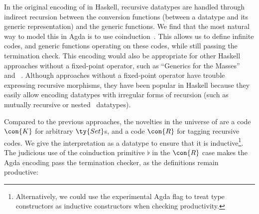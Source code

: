 \documentclass[submission,copyright,creativecommons,sharealike,noncommercial]{eptcs}
\newcommand{\Varid}[1]{\mathit{#1}}
\renewcommand\Varid[1]{\mathord{\textsf{#1}}}
\begin{document}
In the original encoding of \ig in Haskell, recursive datatypes are handled
through indirect recursion between the conversion functions (between a
datatype and its generic representation) and the generic functions. We find
that the most natural way to model this in Agda is to use
coinduction~\cite{subtyping}. This allows us to define infinite codes, and
generic functions operating on these codes, while still passing the
termination check.
This encoding would also be appropriate for other Haskell approaches without a
fixed-point operator, such as ``Generics for the Masses''~\cite{GM} and
\ligd~\cite{LIGD}. Although approaches without a fixed-point operator have
trouble expressing recursive morphisms, they have been popular in Haskell
because they easily allow encoding datatypes with irregular forms of recursion
(such as mutually recursive or nested~\cite{nested} datatypes).

Compared to the previous approaches, the novelties in the universe of \ig are
a code \ensuremath{\con{K}} for arbitrary \ensuremath{\ty{Set}}s, and a code \ensuremath{\con{R}} for tagging recursive codes.
We give the interpretation as a datatype to ensure that it is inductive\footnote{Alternatively, we could use the experimental Agda flag
 to treat type constructors as
inductive constructors when checking productivity.}. The
judicious use of the coinduction primitive \ensuremath{\Varid{♭}} in the \ensuremath{\con{R}} case makes the Agda
encoding pass the termination checker, as the definitions remain productive:
\end{document}

